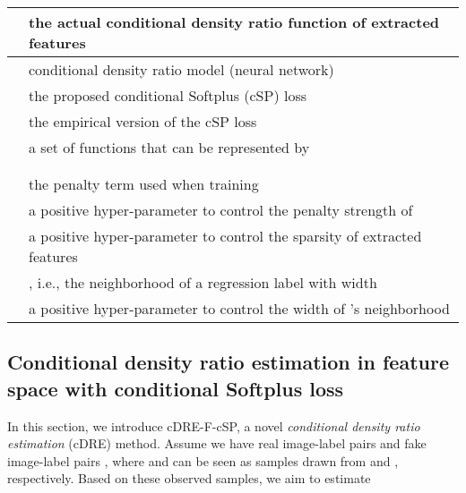\documentclass[final,12pt, 3p,times]{elsarticle}
\begin{document}
\begin{table}[!h]
\begin{adjustbox}{width=1\textwidth}
\begin{tabular}{c|l}
			\hline
			   &   the actual conditional density ratio function of extracted features  \\
			\hline
			   &   conditional density ratio model (neural network)  \\
			\hline
			 & the proposed conditional Softplus (cSP) loss \\
			\hline
			 & the empirical version of the cSP loss \\
			\hline
			   &  a set of functions that can be represented by   \\
			\hline
			 &  \\
			\hline
			 &  \\
			\hline
			   &  the penalty term used when training     \\
			\hline
			 & a positive hyper-parameter to control the penalty strength of   \\
			\hline
			 & a positive hyper-parameter to control the sparsity of extracted features  \\
			\hline
			 & , i.e., the neighborhood of a regression label  with width  \\
			\hline
			 & a positive hyper-parameter to control the width of 's neighborhood  \\
			\bottomrule
		\end{tabular}\end{adjustbox}
	\label{tab:definition_symbols}\end{table}




\subsection{Conditional density ratio estimation in feature space with conditional Softplus loss} \label{sec:cDRE-F-cSP}
In this section, we introduce cDRE-F-cSP, a novel \textit{conditional density ratio estimation} (cDRE) method. Assume we have  real image-label pairs  and  fake image-label pairs , where  and  can be seen as samples drawn from  and , respectively. Based on these observed samples, we aim to estimate
\end{document}
